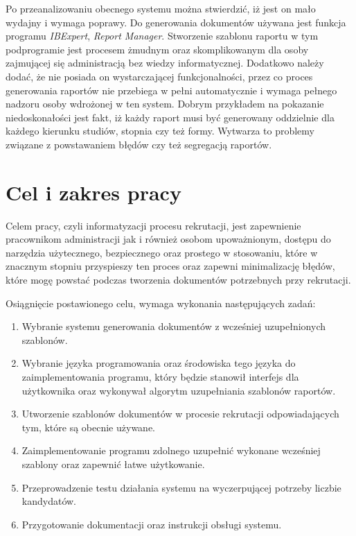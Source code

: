Po przeanalizowaniu obecnego systemu można stwierdzić, iż jest on mało wydajny i wymaga poprawy. Do generowania dokumentów używana jest funkcja programu \emph{IBExpert}, \emph{Report Manager}. Stworzenie szablonu raportu w tym podprogramie jest procesem żmudnym oraz skomplikowanym dla osoby zajmującej się administracją bez wiedzy informatycznej. Dodatkowo należy dodać, że nie posiada on wystarczającej funkcjonalności, przez co proces generowania raportów nie przebiega w pełni automatycznie i wymaga pełnego nadzoru osoby wdrożonej w ten system.  Dobrym przykładem na pokazanie niedoskonałości jest fakt, iż każdy raport musi być generowany oddzielnie dla każdego kierunku studiów, stopnia czy też formy. Wytwarza to problemy związane z powstawaniem błędów czy też segregacją raportów.

\section{Cel i zakres pracy}

Celem pracy, czyli informatyzacji procesu rekrutacji, jest zapewnienie pracownikom administracji jak i również osobom upoważnionym, dostępu do narzędzia użytecznego, bezpiecznego oraz prostego w stosowaniu, które w znacznym stopniu przyspieszy ten proces oraz zapewni minimalizację błędów, które mogę powstać podczas tworzenia dokumentów potrzebnych przy rekrutacji. 
\par
\vspace{10mm}
Osiągnięcie postawionego celu, wymaga wykonania następujących zadań:
\vspace{5mm}
\begin{enumerate}
\item Wybranie systemu generowania dokumentów z wcześniej uzupełnionych szablonów.\vspace{5mm}
\item Wybranie języka programowania oraz środowiska tego języka do zaimplementowania programu, który będzie stanowił interfejs dla użytkownika oraz wykonywał algorytm uzupełniania szablonów raportów.\vspace{5mm}
\item Utworzenie szablonów dokumentów w procesie rekrutacji odpowiadających tym, które są obecnie używane.\vspace{5mm}
\item Zaimplementowanie programu zdolnego uzupełnić wykonane wcześniej szablony oraz zapewnić łatwe użytkowanie.\vspace{5mm}
\item Przeprowadzenie testu działania systemu na wyczerpującej potrzeby liczbie kandydatów.\vspace{5mm}
\item Przygotowanie dokumentacji oraz instrukcji obsługi systemu.\vspace{5mm}
\end{enumerate}
